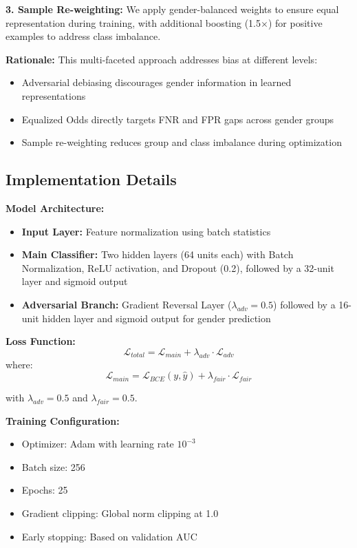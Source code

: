\documentclass[11pt,a4paper]{article}
\begin{document}
\textbf{3. Sample Re-weighting:} We apply gender-balanced weights to ensure equal representation during training, with additional boosting (1.5$\times$) for positive examples to address class imbalance.

\textbf{Rationale:} This multi-faceted approach addresses bias at different levels:
\begin{itemize}
    \item Adversarial debiasing discourages gender information in learned representations
    \item Equalized Odds directly targets FNR and FPR gaps across gender groups
    \item Sample re-weighting reduces group and class imbalance during optimization
\end{itemize}

\subsection{Implementation Details}

\textbf{Model Architecture:}
\begin{itemize}
    \item \textbf{Input Layer:} Feature normalization using batch statistics
    \item \textbf{Main Classifier:} Two hidden layers (64 units each) with Batch Normalization, ReLU activation, and Dropout (0.2), followed by a 32-unit layer and sigmoid output
    \item \textbf{Adversarial Branch:} Gradient Reversal Layer ($\lambda_{adv} = 0.5$) followed by a 16-unit hidden layer and sigmoid output for gender prediction
\end{itemize}

\textbf{Loss Function:}
\begin{equation}
\mathcal{L}_{total} = \mathcal{L}_{main} + \lambda_{adv} \cdot \mathcal{L}_{adv}
\end{equation}
where:
\begin{equation}
\mathcal{L}_{main} = \mathcal{L}_{BCE}(y, \hat{y}) + \lambda_{fair} \cdot \mathcal{L}_{fair}
\end{equation}

with $\lambda_{adv} = 0.5$ and $\lambda_{fair} = 0.5$.

\textbf{Training Configuration:}
\begin{itemize}
    \item Optimizer: Adam with learning rate $10^{-3}$
    \item Batch size: 256
    \item Epochs: 25
    \item Gradient clipping: Global norm clipping at 1.0
    \item Early stopping: Based on validation AUC
\end{itemize}
\end{document}
